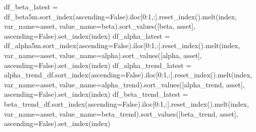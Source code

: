 \documentclass[
  letterpaper,
  DIV=11,
  numbers=noendperiod]{scrartcl}
\newenvironment{Shaded}{\begin{snugshade}}{\end{snugshade}}
\newcommand{\DecValTok}[1]{\textcolor[rgb]{0.68,0.00,0.00}{#1}}
\newcommand{\NormalTok}[1]{\textcolor[rgb]{0.00,0.23,0.31}{#1}}
\newcommand{\OperatorTok}[1]{\textcolor[rgb]{0.37,0.37,0.37}{#1}}
\newcommand{\StringTok}[1]{\textcolor[rgb]{0.13,0.47,0.30}{#1}}
\newcommand{\VariableTok}[1]{\textcolor[rgb]{0.07,0.07,0.07}{#1}}
\begin{document}
\begin{Shaded}
\begin{Highlighting}[]
\NormalTok{df\_beta\_latest }\OperatorTok{=}\NormalTok{ df\_beta5m.sort\_index(ascending}\OperatorTok{=}\VariableTok{False}\NormalTok{).iloc[}\DecValTok{0}\NormalTok{:}\DecValTok{1}\NormalTok{,:].reset\_index().melt(}\StringTok{\textquotesingle{}index\textquotesingle{}}\NormalTok{, var\_name}\OperatorTok{=}\StringTok{\textquotesingle{}asset\textquotesingle{}}\NormalTok{, value\_name}\OperatorTok{=}\StringTok{\textquotesingle{}beta\textquotesingle{}}\NormalTok{).sort\_values([}\StringTok{\textquotesingle{}beta\textquotesingle{}}\NormalTok{, }\StringTok{\textquotesingle{}asset\textquotesingle{}}\NormalTok{], ascending}\OperatorTok{=}\VariableTok{False}\NormalTok{).set\_index(}\StringTok{\textquotesingle{}index\textquotesingle{}}\NormalTok{)}
\NormalTok{df\_alpha\_latest }\OperatorTok{=}\NormalTok{ df\_alpha5m.sort\_index(ascending}\OperatorTok{=}\VariableTok{False}\NormalTok{).iloc[}\DecValTok{0}\NormalTok{:}\DecValTok{1}\NormalTok{,:].reset\_index().melt(}\StringTok{\textquotesingle{}index\textquotesingle{}}\NormalTok{, var\_name}\OperatorTok{=}\StringTok{\textquotesingle{}asset\textquotesingle{}}\NormalTok{, value\_name}\OperatorTok{=}\StringTok{\textquotesingle{}alpha\textquotesingle{}}\NormalTok{).sort\_values([}\StringTok{\textquotesingle{}alpha\textquotesingle{}}\NormalTok{, }\StringTok{\textquotesingle{}asset\textquotesingle{}}\NormalTok{], ascending}\OperatorTok{=}\VariableTok{False}\NormalTok{).set\_index(}\StringTok{\textquotesingle{}index\textquotesingle{}}\NormalTok{)}
\NormalTok{df\_alpha\_trend\_latest }\OperatorTok{=}\NormalTok{ alpha\_trend\_df.sort\_index(ascending}\OperatorTok{=}\VariableTok{False}\NormalTok{).iloc[}\DecValTok{0}\NormalTok{:}\DecValTok{1}\NormalTok{,:].reset\_index().melt(}\StringTok{\textquotesingle{}index\textquotesingle{}}\NormalTok{, var\_name}\OperatorTok{=}\StringTok{\textquotesingle{}asset\textquotesingle{}}\NormalTok{, value\_name}\OperatorTok{=}\StringTok{\textquotesingle{}alpha\_trend\textquotesingle{}}\NormalTok{).sort\_values([}\StringTok{\textquotesingle{}alpha\_trend\textquotesingle{}}\NormalTok{, }\StringTok{\textquotesingle{}asset\textquotesingle{}}\NormalTok{], ascending}\OperatorTok{=}\VariableTok{False}\NormalTok{).set\_index(}\StringTok{\textquotesingle{}index\textquotesingle{}}\NormalTok{)}
\NormalTok{df\_beta\_trend\_latest }\OperatorTok{=}\NormalTok{ beta\_trend\_df.sort\_index(ascending}\OperatorTok{=}\VariableTok{False}\NormalTok{).iloc[}\DecValTok{0}\NormalTok{:}\DecValTok{1}\NormalTok{,:].reset\_index().melt(}\StringTok{\textquotesingle{}index\textquotesingle{}}\NormalTok{, var\_name}\OperatorTok{=}\StringTok{\textquotesingle{}asset\textquotesingle{}}\NormalTok{, value\_name}\OperatorTok{=}\StringTok{\textquotesingle{}beta\_trend\textquotesingle{}}\NormalTok{).sort\_values([}\StringTok{\textquotesingle{}beta\_trend\textquotesingle{}}\NormalTok{, }\StringTok{\textquotesingle{}asset\textquotesingle{}}\NormalTok{], ascending}\OperatorTok{=}\VariableTok{False}\NormalTok{).set\_index(}\StringTok{\textquotesingle{}index\textquotesingle{}}\NormalTok{)}


\end{Highlighting}
\end{Shaded}
\end{document}
